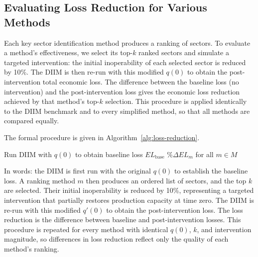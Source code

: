\subsection{Evaluating Loss Reduction for Various Methods}
\label{sec:intervention-procedure}

Each key sector identification method produces a ranking of sectors. To evaluate a method's effectiveness, we select its top-$k$ ranked sectors and simulate a targeted intervention: the initial inoperability of each selected sector is reduced by 10\%. The DIIM is then re-run with this modified $q(0)$ to obtain the post-intervention total economic loss. The difference between the baseline loss (no intervention) and the post-intervention loss gives the economic loss reduction achieved by that method's top-$k$ selection. This procedure is applied identically to the DIIM benchmark and to every simplified method, so that all methods are compared equally.

The formal procedure is given in Algorithm~\ref{alg:loss-reduction}.

\begin{algorithm}[H]
\caption{Evaluating Loss Reduction for Various Methods}\label{alg:loss-reduction}
\BlankLine
Run DIIM with $q(0)$ to obtain baseline loss $EL_{\text{base}}$\;
\BlankLine
{}
\BlankLine
\Return $\%\Delta EL_m$ for all $m \in M$\;
\end{algorithm}

In words: the DIIM is first run with the original $q(0)$ to establish the baseline loss. A ranking method $m$ then produces an ordered list of sectors, and the top $k$ are selected. Their initial inoperability is reduced by 10\%, representing a targeted intervention that partially restores production capacity at time zero. The DIIM is re-run with this modified $q'(0)$ to obtain the post-intervention loss. The loss reduction is the difference between baseline and post-intervention losses. This procedure is repeated for every method with identical $q(0)$, $k$, and intervention magnitude, so differences in loss reduction reflect only the quality of each method's ranking.

